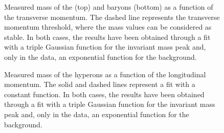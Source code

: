 \begin{figure}[!p]
\hspace*{-2.cm}
\caption{Measured mass of the \rmXi (top) and \rmOmega baryons (bottom) as a function of the transverse momentum. The dashed line represents the transverse momentum threshold, where the mass values can be considered as stable. In both cases, the results have been obtained through a fit with a triple Gaussian function for the invariant mass peak and, only in the data, an exponential function for the background.}
	\label{fig:MassVsPt}
\end{figure}

\begin{figure}[!p]
\hspace*{-2.cm}
\caption{Measured mass of the \rmXi hyperons as a function of the longitudinal momentum. The solid and dashed lines represent a fit with a constant function. In both cases, the results have been obtained through a fit with a triple Gaussian function for the invariant mass peak and, only in the data, an exponential function for the background.}
	\label{fig:MassXiVsPz}
\end{figure}


